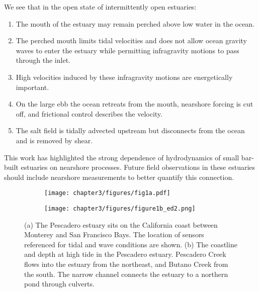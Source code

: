 We see that in the open state of intermittently open estuaries:
\begin{enumerate}
\item The mouth of the estuary may remain perched above low water in the
ocean.
\item The perched mouth limits tidal velocities and does not allow ocean
gravity waves to enter the estuary while permitting infragravity motions
to pass through the inlet.
\item High velocities induced by these infragravity motions are energetically
important.
\item On the large ebb the ocean retreats from the mouth, nearshore forcing
is cut off, and frictional control describes the velocity.
\item The salt field is tidally advected upstream but disconnects from the
ocean and is removed by shear.
\end{enumerate}
This work has highlighted the strong dependence of hydrodynamics of
small bar-built estuaries on nearshore processes. Future field observations
in these estuaries should include nearshore measurements to better
quantify this connection. 








\begin{figure}[t]
\begin{subfigure}{.5\textwidth}
	\centering
	\texttt{[image: chapter3/figures/fig1a.pdf]}
	\label{fig:sfig1a_coastline}
\end{subfigure}
\begin{subfigure}{.5\textwidth}
	\centering
	\texttt{[image: chapter3/figures/figure1b\_ed2.png]}
	\label{fig:sfig1b_pdomap}
\end{subfigure}
\caption{(a) The Pescadero estuary sits on the California coast between Monterey
and San Francisco Bays. The location of sensors referenced for tidal
and wave conditions are shown. (b) The coastline and depth at high
tide in the Pescadero estuary. Pescadero Creek flows into the estuary
from the northeast, and Butano Creek from the south. The narrow channel
connects the estuary to a northern pond through culverts.}
\label{f1_maps}
\end{figure}



